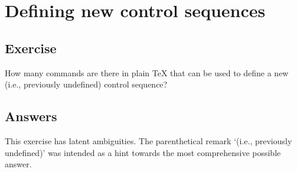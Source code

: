 \chapter{Defining new control sequences}

\section{Exercise}

\begin{comment}
Date: 24 Sep 1993 16:11:36 -0400 (EDT)
From: Michael Downes <MJD@MATH.AMS.ORG>
Subject: Around the Bend #12
To: info-tex@shsu.edu
X-ListName: TeX-Related Network Discussion List <INFO-TeX@SHSU.edu>
========================================================================
*** Exercise 12:
\end{comment}

How many commands are there in plain TeX that can be used to define a
new (i.e., previously undefined) control sequence?

\begin{comment}
========================================================================

E-mail answers to my address, below. A summary will be posted circa
October 15, 1993.

Michael Downes ---------------------------------------------------------
mjd@math.ams.org (Internet) ASCII 32--54,55--126: !"#$%
789:;<=>?@ABCDEFGHIJKLMNOPQRSTUVWXYZ[\]^_`abcdefghijklmnopqrstuvwxyz{|}~
\end{comment}

\section{Answers}

\begin{comment}
[The addendum was not included in the original post but added in my
archives later ---mjd]

Date: 25 Oct 1993 16:36:43 -0400 (EDT)
From: Michael Downes <MJD@MATH.AMS.ORG>
Subject: Around the Bend #12, answer
To: info-tex@shsu.edu
X-ListName: TeX-Related Network Discussion List <INFO-TeX@SHSU.edu>
\end{comment}


This exercise has latent ambiguities. The parenthetical
remark `(i.e., previously undefined)' was intended as a hint towards
the most comprehensive possible answer.

